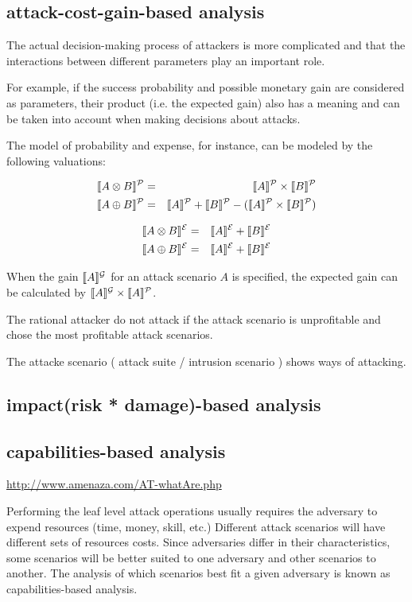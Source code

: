 \subsection{attack-cost-gain-based analysis}

The actual decision-making process of attackers is more complicated and that the interactions between different parameters
play an important role. 

For example, if the success probability and possible monetary gain are considered as parameters, their product (i.e. the expected gain) also has a meaning and can be taken into account when making decisions about attacks.

The model of probability and expense, for instance, can be modeled by the following valuations: 

\begin{eqnarray*}
\llbracket {A \otimes B} \rrbracket^{\mathcal{P}} &=& \llbracket {A} \rrbracket^{\mathcal{P}} \times \llbracket {B} \rrbracket^{\mathcal{P}} \\
\llbracket {A \oplus B} \rrbracket^{\mathcal{P}} 
  &=& \llbracket {A} \rrbracket^{\mathcal{P}} + \llbracket {B} \rrbracket^{\mathcal{P}} - (\llbracket {A} \rrbracket^{\mathcal{P}} \times \llbracket {B} \rrbracket^{\mathcal{P}}) 
\end{eqnarray*}

\begin{eqnarray*}
\llbracket {A \otimes B} \rrbracket^{\mathcal{E}} &=& \llbracket {A} \rrbracket^{\mathcal{E}} + \llbracket {B} \rrbracket^{\mathcal{E}} \\
\llbracket {A \oplus B} \rrbracket^{\mathcal{E}} &=& \llbracket {A} \rrbracket^{\mathcal{E}} + \llbracket {B} \rrbracket^{\mathcal{E}} 
\end{eqnarray*}

When the gain $\llbracket {A} \rrbracket^{\mathcal{G}}$  for an attack scenario $A$  is specified,  the expected gain can be calculated by
$\llbracket {A} \rrbracket^{\mathcal{G}} \times \llbracket {A} \rrbracket^{\mathcal{P}}$. 

The rational attacker do not attack if the attack scenario is unprofitable and chose the most profitable attack scenarios. 

The attacke scenario ( attack suite / intrusion scenario )  shows ways of attacking. 




\subsection{impact(risk * damage)-based analysis}

\subsection{capabilities-based analysis}

\url{http://www.amenaza.com/AT-whatAre.php}

Performing the leaf level attack operations usually requires the adversary to expend resources (time, money, skill, etc.) 
Different attack scenarios will have different sets of resources costs. Since adversaries differ in their characteristics, some scenarios will be better suited to one adversary and other scenarios to another. The analysis of which scenarios best fit a given adversary is known as capabilities-based analysis.
